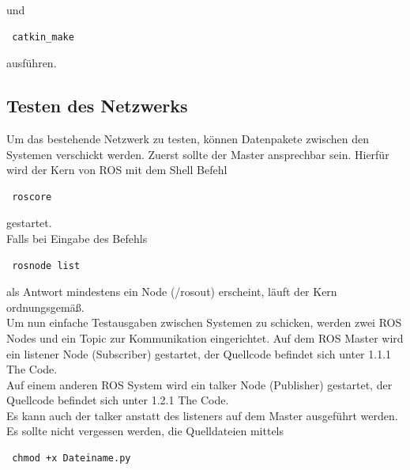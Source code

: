 \documentclass[12pt]{article}
\begin{document}
und  
 
 \begin{lstlisting}
 catkin_make
 \end{lstlisting}
 
ausführen.
\subsection{Testen des Netzwerks}

Um das bestehende Netzwerk zu testen, können Datenpakete zwischen den Systemen verschickt werden.
Zuerst sollte der Master ansprechbar sein.
Hierfür wird der Kern von ROS mit dem Shell Befehl 

 \begin{lstlisting}
 roscore
 \end{lstlisting}

gestartet. \\
Falls bei Eingabe des Befehls

 \begin{lstlisting}
 rosnode list
 \end{lstlisting}

als Antwort mindestens ein Node (/rosout) erscheint, läuft der Kern ordnungsgemäß. \\
Um nun einfache Testausgaben zwischen Systemen zu schicken, werden zwei ROS Nodes und ein Topic zur Kommunikation eingerichtet.
Auf dem ROS Master wird ein listener Node (Subscriber) gestartet, der Quellcode befindet sich unter 1.1.1 The Code. \\
Auf einem anderen ROS System wird ein talker Node (Publisher) gestartet, der Quellcode befindet sich unter 1.2.1 The Code. \\
Es kann auch der talker anstatt des listeners auf dem Master ausgeführt werden.
Es sollte nicht vergessen werden, die Quelldateien mittels

 \begin{lstlisting}
 chmod +x Dateiname.py
 \end{lstlisting}
\end{document}
